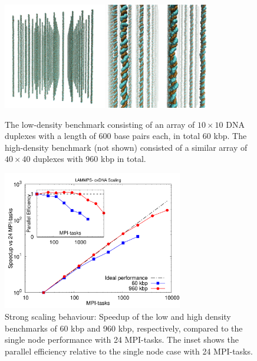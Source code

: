 \documentclass[12pt,onecolumn]{article}
\begin{document}
\begin{figure}[htpb]
\begin{center}
\includegraphics[width=0.4\textwidth]{./pics/bench_60kbps.png}
\includegraphics[width=0.4\textwidth]{./pics/bench2_60kbps.png}
\caption{\label{bench-60kbps} The low-density benchmark consisting of an array of $10\times 10$ DNA duplexes with a length of 600 base pairs each, in total 60 kbp. The high-density benchmark (not shown) consisted of a similar array of $40\times 40$ duplexes with 960 kbp in total.}
\end{center}
\end{figure}

\begin{figure}[htpb]
\begin{center}
\includegraphics[width=0.7\textwidth]{./pics/LAMMPS_oxdna_scaling.pdf}
\caption{\label{scaling} Strong scaling behaviour: Speedup of the low and high density benchmarks of 60 kbp and 960 kbp, respectively, compared
to the single node performance with 24 MPI-tasks. The inset shows the parallel efficiency relative to the single node case with 24 MPI-tasks.}
\end{center}
\end{figure}
\end{document}

